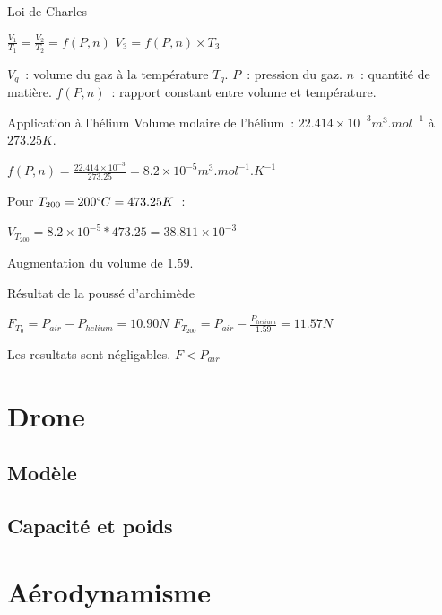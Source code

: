 \documentclass{beamer}
\begin{document}
\begin{frame}{Loi de Charles}
  \begin{center}
    $\displaystyle{\frac{V_1}{T_1} = \frac{V_2}{T_2} = f(P, n)}$
    $\displaystyle{V_3 = f(P, n) \times T_3}$
  \end{center}
  $V_q$~: volume du gaz à la température $T_q$. $P$~: pression du gaz. $n$~: quantité de matière. $f(P, n)$~: rapport constant entre volume et température.
\end{frame}

\begin{frame}{Application à l'hélium}
  Volume molaire de l'hélium~: $22.414\times 10^{-3} m^3.mol^{-1}$ à $273.25K$.
  \begin{center}
    $\displaystyle{f(P, n) = \frac{22.414\times 10^{-3}}{273.25} = 8.2\times 10^{-5} m^3.mol^{-1}.K^{-1}}$
  \end{center}
  Pour $T_{200} = 200 \degree C = 473.25 K$~:
  \begin{center}
    $\displaystyle{V_{T_{200}} = 8.2\times 10^{-5} * 473.25 = 38.811 \times 10^{-3}}$
  \end{center}
  Augmentation du volume de $1.59$.
\end{frame}

\begin{frame}{Résultat de la poussé d'archimède}
  \begin{center}
    $\displaystyle{F_{T_0} = P_{air} - P_{helium} = 10.90 N}$
    \bigbreak
    $\displaystyle{F_{T_{200}} = P_{air} - \frac{P_{helium}}{1.59} = 11.57 N}$ \\
  \end{center}
  Les resultats sont négligables. $F < P_{air}$
\end{frame}

\section{Drone}

\subsection{Modèle}
\subsection{Capacité et poids}

\section{Aérodynamisme}
\end{document}
